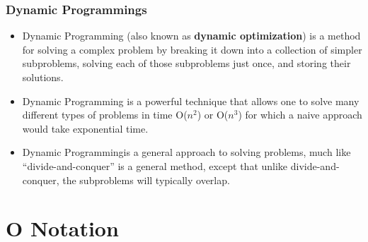 \documentclass{beamer}
\begin{document}
\begin{frame}


\frametitle{Dynamic Programmings}
\begin{itemize}
	\item Dynamic Programming (also known as \textbf{dynamic optimization}) is a method for solving a complex problem by breaking it down into a collection of simpler subproblems, solving each of those subproblems just once, and storing their solutions.
	
\item Dynamic Programming is a powerful technique that allows one to solve many different types of
	problems in time O($n^2$) or O($n^3$) for which a naive approach would take exponential time. 
	
\item Dynamic Programmingis a general approach to solving problems, much like “divide-and-conquer” is a general
	method, except that unlike divide-and-conquer, the subproblems will typically overlap.
\end{itemize}

\end{frame}


\section{O Notation}
\end{document}
